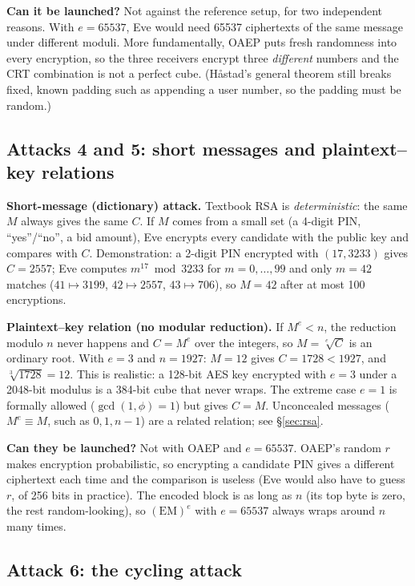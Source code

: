 \textbf{Can it be launched?} Not against the reference setup, for two independent reasons. With $e = 65537$, Eve would need 65537 ciphertexts of the same message under different moduli. More fundamentally, OAEP puts fresh randomness into every encryption, so the three receivers encrypt three \emph{different} numbers and the CRT combination is not a perfect cube. (H\aa stad's general theorem still breaks fixed, known padding such as appending a user number, so the padding must be random.)

\subsection{Attacks 4 and 5: short messages and plaintext--key relations \new}

\textbf{Short-message (dictionary) attack.} Textbook RSA is \emph{deterministic}: the same $M$ always gives the same $C$. If $M$ comes from a small set (a 4-digit PIN, ``yes''/``no'', a bid amount), Eve encrypts every candidate with the public key and compares with $C$. Demonstration: a 2-digit PIN encrypted with $(17, 3233)$ gives $C = 2557$; Eve computes $m^{17} \bmod 3233$ for $m = 0, \dots, 99$ and only $m = 42$ matches ($41 \mapsto 3199$, $42 \mapsto 2557$, $43 \mapsto 706$), so $M = 42$ after at most 100 encryptions.

\textbf{Plaintext--key relation (no modular reduction).} If $M^e < n$, the reduction modulo $n$ never happens and $C = M^e$ over the integers, so $M = \sqrt[e]{C}$ is an ordinary root. With $e = 3$ and $n = 1927$: $M = 12$ gives $C = 1728 < 1927$, and $\sqrt[3]{1728} = 12$. This is realistic: a 128-bit AES key encrypted with $e = 3$ under a 2048-bit modulus is a 384-bit cube that never wraps. The extreme case $e = 1$ is formally allowed ($\gcd(1, \phi) = 1$) but gives $C = M$. Unconcealed messages ($M^e \equiv M$, such as $0, 1, n - 1$) are a related relation; see \S\ref{sec:rsa}.

\textbf{Can they be launched?} Not with OAEP and $e = 65537$. OAEP's random $r$ makes encryption probabilistic, so encrypting a candidate PIN gives a different ciphertext each time and the comparison is useless (Eve would also have to guess $r$, of 256 bits in practice). The encoded block is as long as $n$ (its top byte is zero, the rest random-looking), so $(\text{EM})^{e}$ with $e = 65537$ always wraps around $n$ many times.

\subsection{Attack 6: the cycling attack \new}

